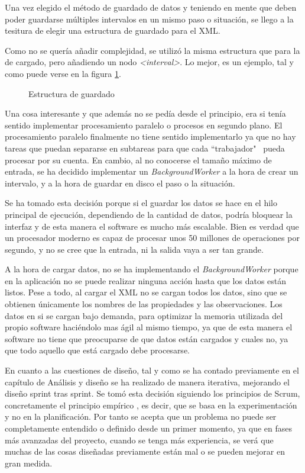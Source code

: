 Una vez elegido el m\'etodo de guardado de datos y teniendo en mente que
deben poder guardarse m\'ultiples intervalos en un mismo paso o situaci\'on, se llego a la tesitura de elegir una estructura de guardado para el XML.

Como no se quería añadir complejidad, se utilizó la misma estructura que
para la de cargado, pero añadiendo un nodo \emph{<interval>}. Lo mejor, es un
ejemplo, tal y como puede verse en la figura \ref{EstructuraGuardado}.

\begin{figure}[h]
    
    \caption[Estructura de guardado]{Estructura de guardado}
    \label{EstructuraGuardado}
\end{figure}

Una cosa interesante y que adem\'as no se ped\'ia desde el principio, era si 
ten\'ia sentido implementar procesamiento paralelo o procesos en segundo plano. El 
procesamiento paralelo finalmente no tiene sentido implementarlo ya que no hay tareas
que puedan separarse en subtareas para que cada ``trabajador" \ pueda procesar por su
cuenta. En cambio, al no conocerse el tama\~no m\'aximo de entrada, se ha decidido
implementar un \emph{BackgroundWorker} a la hora de crear un intervalo, y a la hora
de guardar en disco el paso o la situaci\'on.

Se ha tomado esta decisi\'on porque si el guardar los datos se hace en el hilo principal
de ejecuci\'on, dependiendo de la cantidad de datos, podr\'ia bloquear la interfaz y
de esta manera el software es mucho m\'as escalable. Bien es
verdad que un procesador moderno es capaz de procesar unos 50 millones de operaciones por
segundo, y no se cree que la entrada, ni la salida vaya a ser tan grande.

A la hora de cargar datos, no se ha implementando el \emph{BackgroundWorker}
porque en la aplicaci\'on no se puede realizar ninguna acci\'on hasta que los datos est\'an 
listos. Pese a todo, al cargar el XML no se cargan todos los datos, sino que se obtienen \'unicamente
los nombres de las propiedades y las observaciones. Los datos en si se cargan bajo demanda, para optimizar la memoria
utilizada del propio software haci\'endolo mas \'agil al mismo tiempo, ya que de esta manera el software no
tiene que preocuparse de que datos est\'an cargados y cuales no, ya que todo aquello que est\'a cargado debe
procesarse.

En cuanto a las cuestiones de dise\~no, tal y como se ha contado previamente en el cap\'itulo
de An\'alisis y dise\~no se ha realizado de manera iterativa, mejorando el dise\~no sprint tras sprint. Se tom\'o esta decisi\'on siguiendo los principios de Scrum, concretamente
el principio emp\'irico \cite{SCRUM:Empiricism}, es decir, que se basa 
en la experimentaci\'on y no
en la planificaci\'on. Por tanto 
se acepta que un problema no puede ser completamente entendido o definido desde un primer
momento, ya que en fases m\'as avanzadas del proyecto, cuando se tenga m\'as experiencia,
se ver\'a que muchas de las cosas dise\~nadas previamente est\'an mal o se pueden
mejorar en gran medida.

